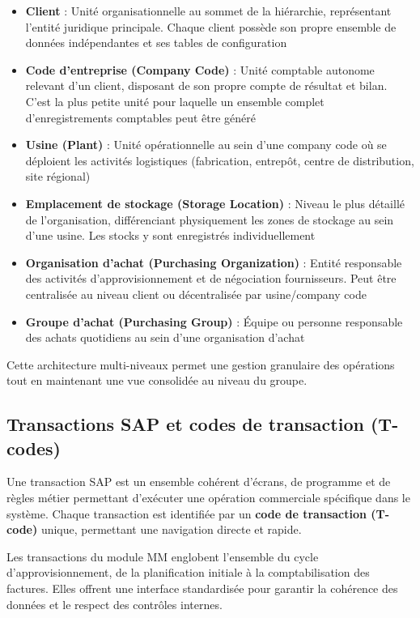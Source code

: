 \documentclass[12pt,a4paper,oneside]{report}
\begin{document}
\begin{itemize}[label=\textbullet, itemsep=0.2em]
	\item \textbf{Client} : Unité organisationnelle au sommet de la hiérarchie, représentant l'entité juridique principale. Chaque client possède son propre ensemble de données indépendantes et ses tables de configuration
	\item \textbf{Code d'entreprise (Company Code)} : Unité comptable autonome relevant d'un client, disposant de son propre compte de résultat et bilan. C'est la plus petite unité pour laquelle un ensemble complet d'enregistrements comptables peut être généré
	\item \textbf{Usine (Plant)} : Unité opérationnelle au sein d'une company code où se déploient les activités logistiques (fabrication, entrepôt, centre de distribution, site régional)
	\item \textbf{Emplacement de stockage (Storage Location)} : Niveau le plus détaillé de l'organisation, différenciant physiquement les zones de stockage au sein d'une usine. Les stocks y sont enregistrés individuellement
	\item \textbf{Organisation d'achat (Purchasing Organization)} : Entité responsable des activités d'approvisionnement et de négociation fournisseurs. Peut être centralisée au niveau client ou décentralisée par usine/company code
	\item \textbf{Groupe d'achat (Purchasing Group)} : Équipe ou personne responsable des achats quotidiens au sein d'une organisation d'achat
\end{itemize}

Cette architecture multi-niveaux permet une gestion granulaire des opérations tout en maintenant une vue consolidée au niveau du groupe.

\subsection{Transactions SAP et codes de transaction (T-codes)}\label{ch2:mm-transactions}

Une transaction SAP est un ensemble cohérent d'écrans, de programme et de règles métier permettant d'exécuter une opération commerciale spécifique dans le système. 
Chaque transaction est identifiée par un \textbf{code de transaction (T-code)} unique, permettant une navigation directe et rapide.

Les transactions du module MM englobent l'ensemble du cycle d'approvisionnement, de la planification initiale à la comptabilisation 
des factures. Elles offrent une interface standardisée pour garantir la cohérence des données et le respect des contrôles internes.
\end{document}
